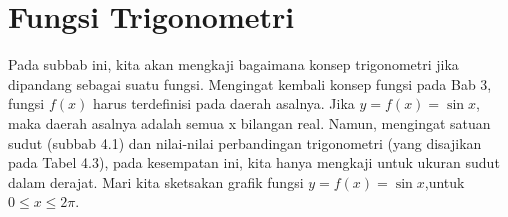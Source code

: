 \documentclass[11pt,fleqn]{book} %
\begin{document}
\section{Fungsi Trigonometri}

Pada subbab ini, kita akan  mengkaji bagaimana konsep trigonometri jika dipandang sebagai suatu fungsi. Mengingat kembali konsep fungsi pada Bab 3, fungsi $f(x)$ harus terdefinisi pada daerah asalnya. Jika $y = f(x) = \sin x$, maka daerah asalnya adalah semua x bilangan real. Namun, mengingat satuan sudut  (subbab 4.1) dan nilai-nilai perbandingan trigonometri (yang disajikan pada Tabel 4.3),  pada kesempatan ini, kita hanya mengkaji  untuk  ukuran sudut dalam derajat. Mari kita sketsakan grafik fungsi $y = f(x) = \sin x$,untuk $0 \leq x\leq 2\pi$.\\
\end{document}

